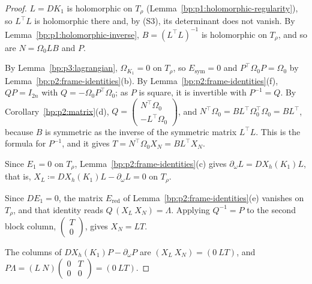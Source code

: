 \begin{proof}
\label{step:p3:red-holomorphy}
$L=DK_1$ is holomorphic on $T_\rho$ (Lemma~\ref{bp:p1:holomorphic-regularity}), so $L^\top L$ is
holomorphic there and, by (S3), its determinant does not vanish. By
Lemma~\ref{bp:p1:holomorphic-inverse}, $B=(L^\top L)^{-1}$ is holomorphic on $T_\rho$, and so are
$N=\Omega_0LB$ and $P$.

\label{step:p3:red-frame}
By Lemma~\ref{bp:p3:lagrangian}, $\Omega_{K_1}=0$ on $T_\rho$, so $E_{\mathrm{sym}}=0$ and
$P^\top\Omega_0P=\Omega_0$ by Lemma~\ref{bp:p2:frame-identities}(b). By
Lemma~\ref{bp:p2:frame-identities}(f), $QP=I_{2n}$ with $Q=-\Omega_0P^\top\Omega_0$; as $P$ is square, it is
invertible with $P^{-1}=Q$. By Corollary~\ref{bp:p2:matrix}(d),
$Q=\left(\begin{smallmatrix}N^\top\Omega_0\\-L^\top\Omega_0\end{smallmatrix}\right)$, and
$N^\top\Omega_0=BL^\top\Omega_0^\top\Omega_0=BL^\top$, because $B$ is symmetric as the inverse of the
symmetric matrix $L^\top L$. This is the formula for $P^{-1}$, and it gives
$T=N^\top\Omega_0X_N=BL^\top X_N$.

\label{step:p3:red-tangent}
Since $E_1=0$ on $T_\rho$, Lemma~\ref{bp:p2:frame-identities}(c) gives $\partial_\omega L=DX_h(K_1)L$, that
is, $X_L\coloneqq DX_h(K_1)L-\partial_\omega L=0$ on $T_\rho$.

\label{step:p3:red-normal}
Since $DE_1=0$, the matrix $E_{\mathrm{red}}$ of Lemma~\ref{bp:p2:frame-identities}(e) vanishes on
$T_\rho$, and that identity reads $Q\,(X_L\ X_N)=\Lambda$. Applying $Q^{-1}=P$ to the second block column,
$\left(\begin{smallmatrix}T\\0\end{smallmatrix}\right)$, gives $X_N=LT$.

\label{step:p3:red-assembly}
The columns of $DX_h(K_1)P-\partial_\omega P$ are $(X_L\ X_N)=(0\ LT)$, and $P\Lambda=(L\ N)
\left(\begin{smallmatrix}0&T\\0&0\end{smallmatrix}\right)=(0\ LT)$.
\end{proof}


